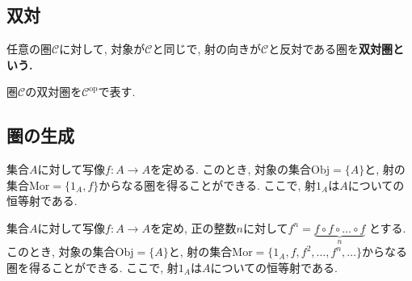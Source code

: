 \subsection{双対}
\begin{Def}
任意の圏$\mathscr{C}$に対して, 対象が$\mathscr{C}$と同じで, 射の向きが$\mathscr{C}$と反対である圏を\bf{双対圏}という.
\end{Def}
\begin{Notation}
圏$\mathscr{C}$の双対圏を$\mathscr{C}^{\mathrm{op}}$で表す.
\end{Notation}
\begin{comment}
\begin{caution}
双対の原理
\end{caution}
\end{comment}
\subsection{圏の生成}
\begin{Prop}
集合$A$に対して写像$f:A\rightarrow A$を定める.
このとき, 対象の集合$\mathrm{Obj}=\{A\}$と, 射の集合$\mathrm{Mor}=\{1_A,f\}$からなる圏を得ることができる.
ここで, 射$1_A$は$A$についての恒等射である.
\end{Prop}
\begin{comment}
\begin{proof}
$\mathrm{dom} f=\mathrm{cod}f$であるから, 合成射$f\circ f$を定めることができる.
このとき$f\circ f=1_A$もしくは$f\circ f=f$である.

$f\circ f=1_A$ならば...

...

となる.
一方, $f\circ f=1_A$ならば...

...

となる.
以上より, いずれの場合も, 射の合成が結合律を満たすことがわかる.
したがって$f\circ f=1_A$と定めても$f\circ f=f$と定めても圏を生成することができる.
\end{proof}
\end{comment}
\begin{Prop}
集合$A$に対して写像$f:A\rightarrow A$を定め, 正の整数$n$に対して$f^n=\underbrace{f\circ f \circ \dots \circ f}_{n}$
とする.
このとき, 対象の集合$\mathrm{Obj}=\{A\}$と, 射の集合$\mathrm{Mor}=\{1_A,f,f^2,\dots,f^n,\dots\}$からなる圏を得ることができる.
ここで, 射$1_A$は$A$についての恒等射である.
\end{Prop}
\begin{comment}
\begin{proof}
\end{proof}
\end{comment}
